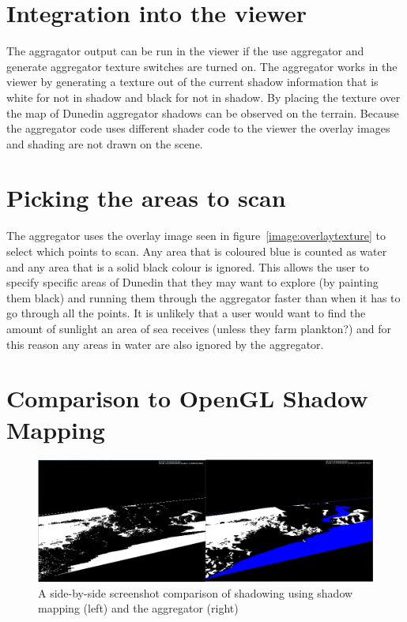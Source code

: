 \documentclass[12pt]{report}
\begin{document}
\section{Integration into the viewer}
The aggragator output can be run in the viewer if the use aggregator and generate aggregator texture switches are turned on. The aggregator works in the viewer by generating a texture out of the current shadow information that is white for not in shadow and black for not in shadow. By placing the texture over the map of Dunedin aggregator shadows can be observed on the terrain. Because the aggregator code uses different shader code to the viewer the overlay images and shading are not drawn on the scene.

\section{Picking the areas to scan}
The aggregator uses the overlay image seen in figure~\ref{image:overlaytexture} to select which points to scan. Any area that is coloured blue is counted as water and any area that is a solid black colour is ignored. This allows the user to specify specific areas of Dunedin that they may want to explore (by painting them black) and running them through the aggregator faster than when it has to go through all the points. It is unlikely that a user would want to find the amount of sunlight an area of sea receives (unless they farm plankton?) and for this reason any areas in water are also ignored by the aggregator.

\section{Comparison to OpenGL Shadow Mapping}
\begin{figure}[h]
\centering
\includegraphics[scale=0.6]{aggregatorvsshadowmapping.png}
\caption{A side-by-side screenshot comparison of shadowing using shadow mapping (left) and the aggregator (right)}
\label{image:aggregatorvsshadowmapping}
\end{figure}
\end{document}
